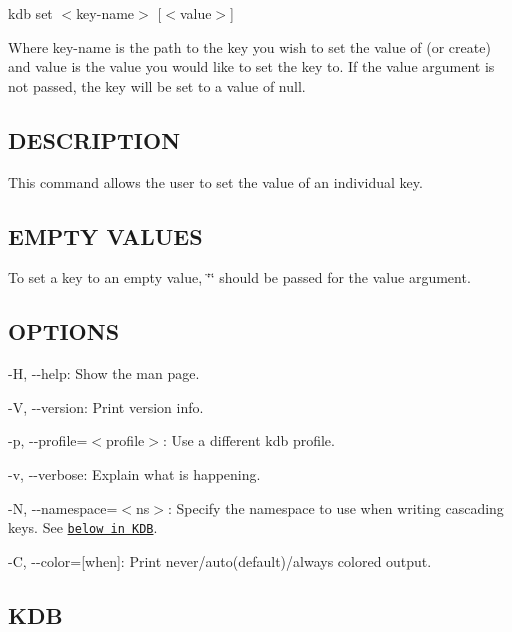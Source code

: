 {\ttfamily kdb set $<$key-\/name$>$ \mbox{[}$<$value$>$\mbox{]}}

Where {\ttfamily key-\/name} is the path to the key you wish to set the value of (or create) and {\ttfamily value} is the value you would like to set the key to. If the {\ttfamily value} argument is not passed, the key will be set to a value of {\ttfamily null}.

\subsection*{D\+E\+S\+C\+R\+I\+P\+T\+I\+O\+N}

This command allows the user to set the value of an individual key.

\subsection*{E\+M\+P\+T\+Y V\+A\+L\+U\+E\+S}

To set a key to an empty value, {\ttfamily \char`\"{}\char`\"{}} should be passed for the {\ttfamily value} argument.

\subsection*{O\+P\+T\+I\+O\+N\+S}


\begin{DoxyItemize}
\item {\ttfamily -\/\+H}, {\ttfamily -\/-\/help}\+: Show the man page.
\item {\ttfamily -\/\+V}, {\ttfamily -\/-\/version}\+: Print version info.
\item {\ttfamily -\/p}, {\ttfamily -\/-\/profile}=$<$profile$>$\+: Use a different kdb profile.
\item {\ttfamily -\/v}, {\ttfamily -\/-\/verbose}\+: Explain what is happening.
\item {\ttfamily -\/\+N}, {\ttfamily -\/-\/namespace}=$<$ns$>$\+: Specify the namespace to use when writing cascading keys. See \href{#KDB}{\tt below in K\+D\+B}.
\item {\ttfamily -\/\+C}, {\ttfamily -\/-\/color}=\mbox{[}when\mbox{]}\+: Print never/auto(default)/always colored output.
\end{DoxyItemize}

\subsection*{K\+D\+B}


